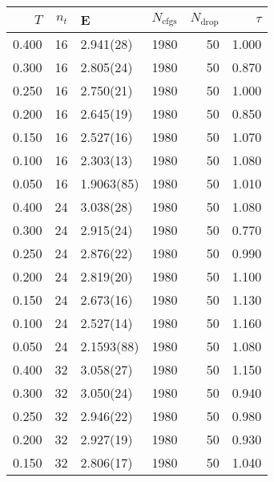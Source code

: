 \begin{tabular}{rrlrrr}
\hline
   $T$ &   $n_t$ & E          &   $N_\textrm{cfgs}$ &   $N_\textrm{drop}$ &   $\tau$ \\
\hline
 0.400 &      16 & 2.941(28)  &                1980 &                  50 &    1.000 \\
 0.300 &      16 & 2.805(24)  &                1980 &                  50 &    0.870 \\
 0.250 &      16 & 2.750(21)  &                1980 &                  50 &    1.000 \\
 0.200 &      16 & 2.645(19)  &                1980 &                  50 &    0.850 \\
 0.150 &      16 & 2.527(16)  &                1980 &                  50 &    1.070 \\
 0.100 &      16 & 2.303(13)  &                1980 &                  50 &    1.080 \\
 0.050 &      16 & 1.9063(85) &                1980 &                  50 &    1.010 \\
 0.400 &      24 & 3.038(28)  &                1980 &                  50 &    1.080 \\
 0.300 &      24 & 2.915(24)  &                1980 &                  50 &    0.770 \\
 0.250 &      24 & 2.876(22)  &                1980 &                  50 &    0.990 \\
 0.200 &      24 & 2.819(20)  &                1980 &                  50 &    1.100 \\
 0.150 &      24 & 2.673(16)  &                1980 &                  50 &    1.130 \\
 0.100 &      24 & 2.527(14)  &                1980 &                  50 &    1.160 \\
 0.050 &      24 & 2.1593(88) &                1980 &                  50 &    1.080 \\
 0.400 &      32 & 3.058(27)  &                1980 &                  50 &    1.150 \\
 0.300 &      32 & 3.050(24)  &                1980 &                  50 &    0.940 \\
 0.250 &      32 & 2.946(22)  &                1980 &                  50 &    0.980 \\
 0.200 &      32 & 2.927(19)  &                1980 &                  50 &    0.930 \\
 0.150 &      32 & 2.806(17)  &                1980 &                  50 &    1.040 \\

\end{tabular}
